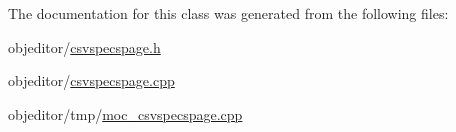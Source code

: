 The documentation for this class was generated from the following files\+:\begin{DoxyCompactItemize}
\item 
objeditor/\mbox{\hyperlink{csvspecspage_8h}{csvspecspage.\+h}}\item 
objeditor/\mbox{\hyperlink{csvspecspage_8cpp}{csvspecspage.\+cpp}}\item 
objeditor/tmp/\mbox{\hyperlink{moc__csvspecspage_8cpp}{moc\+\_\+csvspecspage.\+cpp}}\end{DoxyCompactItemize}
